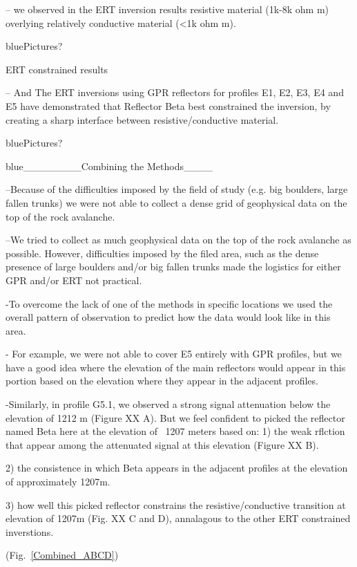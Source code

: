\documentclass[5p]{elsarticle}
\newcommand{\COMON}{\begin{color}{blue}}
\newcommand{\COMOFF}{\end{color}}
\begin{document}
– we observed  in the ERT inversion results resistive material (1k-8k ohm m) overlying relatively conductive material (<1k ohm m).

\COMON Pictures? \COMOFF



ERT constrained results 

– And The ERT inversions using GPR reflectors for profiles E1, E2, E3, E4 and E5 have demonstrated that Reflector Beta best constrained the inversion, by creating a sharp interface between resistive/conductive material.


\COMON Pictures? \COMOFF


\COMON ________Combining the Methods____ \COMOFF


--Because of the difficulties imposed by the field of study (e.g. big boulders,  large fallen trunks) we were not able to collect a dense grid of geophysical data on the top of the rock avalanche. 

--We tried to collect as much geophysical data on the top of the rock avalanche as possible. However, difficulties imposed by the filed area, such as the dense presence of large boulders and/or big fallen trunks made the logistics for either GPR and/or ERT not practical. 

-To overcome the lack of one of the methods in specific locations we used the overall pattern of observation to predict how the data would look like in this area. 

- For example, we were not able to cover E5 entirely with GPR profiles, but we have a good idea where the elevation of the main reflectors would appear in this portion based on the elevation where they appear in the adjacent profiles.

-Similarly, in profile G5.1, we observed a strong signal attenuation below the elevation of 1212 m (Figure XX A). But we feel confident to picked the reflector named Beta here at the elevation of ~1207 meters based on: 
1) the weak rflction that appear among the attenuated signal at this elevation (Figure XX B).

2) the consistence in which Beta appears in the adjacent profiles at the elevation of approximately 1207m.

3) how well this picked reflector constrains the resistive/conductive transition at elevation of 1207m (Fig. XX C and D), annalagous to the other ERT constrained inverstions. 
								   
				(Fig.~\ref{Combined_ABCD})			
\end{document}
